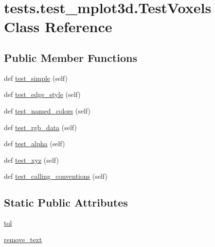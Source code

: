 \hypertarget{classtests_1_1test__mplot3d_1_1TestVoxels}{}\section{tests.\+test\+\_\+mplot3d.\+Test\+Voxels Class Reference}
\label{classtests_1_1test__mplot3d_1_1TestVoxels}
\subsection*{Public Member Functions}
\begin{DoxyCompactItemize}
\item 
def \hyperlink{classtests_1_1test__mplot3d_1_1TestVoxels_abfafeaf9b853fa6885e7195601c013c8}{test\+\_\+simple} (self)
\item 
def \hyperlink{classtests_1_1test__mplot3d_1_1TestVoxels_a7c4409ae1df32c73a0b6b9d7c4542875}{test\+\_\+edge\+\_\+style} (self)
\item 
def \hyperlink{classtests_1_1test__mplot3d_1_1TestVoxels_a04f169ce87e16e24618d90be1a443bd3}{test\+\_\+named\+\_\+colors} (self)
\item 
def \hyperlink{classtests_1_1test__mplot3d_1_1TestVoxels_ae40deac558ba4fab333ae74c3533d6e9}{test\+\_\+rgb\+\_\+data} (self)
\item 
def \hyperlink{classtests_1_1test__mplot3d_1_1TestVoxels_a277f153286f5bc3cea5a86594b88e919}{test\+\_\+alpha} (self)
\item 
def \hyperlink{classtests_1_1test__mplot3d_1_1TestVoxels_a4e6d721e7a1b459d319509fa8b3bf5c1}{test\+\_\+xyz} (self)
\item 
def \hyperlink{classtests_1_1test__mplot3d_1_1TestVoxels_a25987eb63cf32281bc08aa015971c609}{test\+\_\+calling\+\_\+conventions} (self)
\end{DoxyCompactItemize}
\subsection*{Static Public Attributes}
\begin{DoxyCompactItemize}
\item 
\hyperlink{classtests_1_1test__mplot3d_1_1TestVoxels_aec9c312ccfdcbb336bfbab0b7dda1d6d}{tol}
\item 
\hyperlink{classtests_1_1test__mplot3d_1_1TestVoxels_ae43aac4a147788be888e4d8d2e735af7}{remove\+\_\+text}
\end{DoxyCompactItemize}


